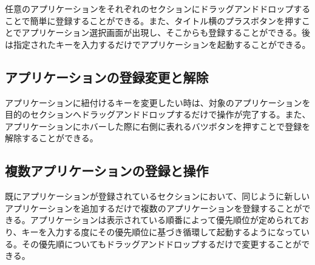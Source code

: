 任意のアプリケーションをそれぞれのセクションにドラッグアンドドロップすることで簡単に登録することができる。また、タイトル横のプラスボタンを押すことでアプリケーション選択画面が出現し、そこからも登録することができる。後は指定されたキーを入力するだけでアプリケーションを起動することができる。

\subsection{アプリケーションの登録変更と解除}

アプリケーションに紐付けるキーを変更したい時は、対象のアプリケーションを目的のセクションへドラッグアンドドロップするだけで操作が完了する。また、アプリケーションにホバーした際に右側に表れるバツボタンを押すことで登録を解除することができる。

\subsection{複数アプリケーションの登録と操作}

既にアプリケーションが登録されているセクションにおいて、同じように新しいアプリケーションを追加するだけで複数のアプリケーションを登録することができる。アプリケーションは表示されている順番によって優先順位が定められており、キーを入力する度にその優先順位に基づき循環して起動するようになっている。その優先順についてもドラッグアンドドロップするだけで変更することができる。